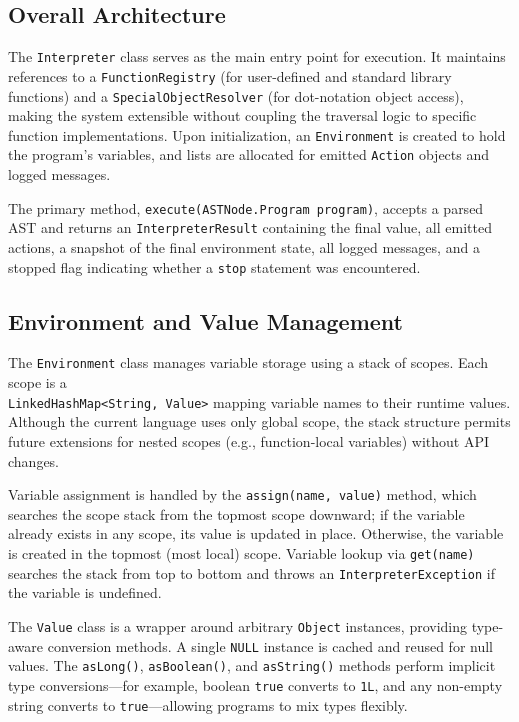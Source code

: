\subsection{Overall Architecture}

The \texttt{Interpreter} class serves as the main entry point for execution.
It maintains references to a \texttt{FunctionRegistry} (for user-defined and standard library functions) and a \texttt{SpecialObjectResolver} (for dot-notation object access), making the system extensible without coupling the traversal logic to specific function implementations.
Upon initialization, an \texttt{Environment} is created to hold the program's variables, and lists are allocated for emitted \texttt{Action} objects and logged messages.

The primary method, \texttt{execute(ASTNode.Program program)}, accepts a parsed AST and returns an \texttt{InterpreterResult} containing the final value, all emitted actions, a snapshot of the final environment state, all logged messages, and a stopped flag indicating whether a \texttt{stop} statement was encountered.

\subsection{Environment and Value Management}

The \texttt{Environment} class manages variable storage using a stack of scopes.
Each scope is a \\ \texttt{LinkedHashMap<String, Value>} mapping variable names to their runtime values.
Although the current language uses only global scope, the stack structure permits future extensions for nested scopes (e.g., function-local variables) without API changes.

Variable assignment is handled by the \texttt{assign(name, value)} method, which searches the scope stack from the topmost scope downward; if the variable already exists in any scope, its value is updated in place.
Otherwise, the variable is created in the topmost (most local) scope.
Variable lookup via \texttt{get(name)} searches the stack from top to bottom and throws an \texttt{InterpreterException} if the variable is undefined.

The \texttt{Value} class is a wrapper around arbitrary \texttt{Object} instances, providing type-aware conversion methods.
A single \texttt{NULL} instance is cached and reused for null values.
The \texttt{asLong()}, \texttt{asBoolean()}, and \texttt{asString()} methods perform implicit type conversions---for example, boolean \texttt{true} converts to \texttt{1L}, and any non-empty string converts to \texttt{true}---allowing programs to mix types flexibly.

